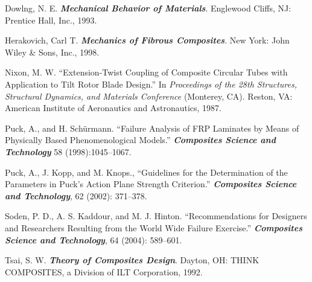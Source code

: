 \documentclass{AeroStructure-ERJohnson}
\begin{document}
\begin{thebibliography}{}\label{sec9.3}
\bibitem{} Dowlng, N. E. \textit{\textbf{Mechanical Behavior of Materials}}. Englewood Cliffs, NJ: Prentice Hall, Inc., 1993.

\bibitem{} Herakovich, Carl T. \textit{\textbf{Mechanics of Fibrous Composites}}. New York: John Wiley \& Sons, Inc., 1998.

\bibitem{} Nixon, M. W. ``Extension-Twist Coupling of Composite Circular Tubes with Application to Tilt Rotor Blade Design.'' In \textit{Proceedings of the 28th Structures, Structural Dynamics, and Materials Conference} (Monterey, CA). Reston, VA: American Institute of Aeronautics and Astronautics, 1987.

\bibitem{} Puck, A., and H. Schürmann. ``Failure Analysis of FRP Laminates by Means of Physically Based Phenomenological Models.'' \textit{\textbf{Composites Science and Technology}} 58 (1998):1045--1067.

\bibitem{} Puck, A., J. Kopp, and M. Knops., ``Guidelines for the Determination of the Parameters in Puck's Action Plane Strength Criterion.'' \textit{\textbf{Composites Science and Technology}}, 62 (2002): 371--378.

\bibitem{} Soden, P. D., A. S. Kaddour, and M. J. Hinton. ``Recommendations for Designers and Researchers Resulting from the World Wide Failure Exercise.'' \textit{\textbf{Composites Science and Technology}}, 64 (2004): 589--601.

\bibitem{} Tsai, S. W. \textit{\textbf{Theory of Composites Design}}. Dayton, OH: THINK COMPOSITES, a Division of ILT Corporation, 1992.
\end{thebibliography}

\cleardoublepage
\end{document}
